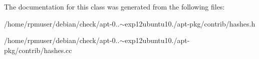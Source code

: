 \-The documentation for this class was generated from the following files\-:\begin{DoxyCompactItemize}
\item 
/home/rpmuser/debian/check/apt-\/0..$\sim$exp12ubuntu10./apt-\/pkg/contrib/hashes.\-h\item 
/home/rpmuser/debian/check/apt-\/0..$\sim$exp12ubuntu10./apt-\/pkg/contrib/hashes.\-cc\end{DoxyCompactItemize}

